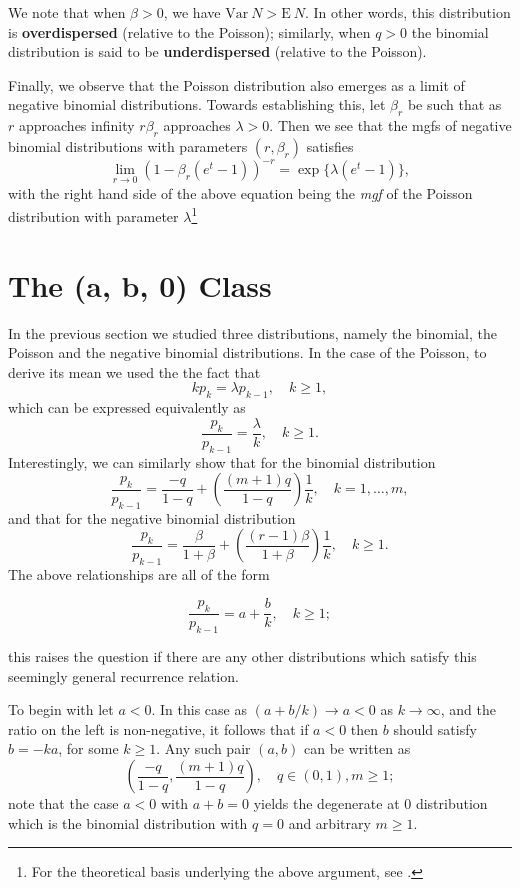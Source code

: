 \documentclass[]{book}
\let\rmarkdownfootnote\footnote%
\def\footnote{\protect\rmarkdownfootnote}
\theoremstyle{definition}
\theoremstyle{definition}
\theoremstyle{definition}
\theoremstyle{remark}
\begin{document}
We note that when \(\beta>0\), we have
\(\mathrm{Var}~{N} >\mathrm{E}~{N}\). In other words, this distribution
is \textbf{overdispersed} (relative to the Poisson); similarly, when
\(q>0\) the binomial distribution is said to be \textbf{underdispersed}
(relative to the Poisson).

Finally, we observe that the Poisson distribution also emerges as a
limit of negative binomial distributions. Towards establishing this, let
\(\beta_r\) be such that as \(r\) approaches infinity \(r\beta_r\)
approaches \(\lambda>0\). Then we see that the mgfs of negative binomial
distributions with parameters \((r,\beta_r)\) satisfies \[
\lim_{r\rightarrow 0} (1-\beta_r(e^t-1))^{-r}=\exp\{\lambda(e^t-1)\},
\] with the right hand side of the above equation being the \emph{mgf}
of the Poisson distribution with parameter \(\lambda\)\footnote{For the
  theoretical basis underlying the above argument, see
  \citep{billingsley}.}

\section{The (a, b, 0) Class}\label{S:the-a-b-0-class}

In the previous section we studied three distributions, namely the
binomial, the Poisson and the negative binomial distributions. In the
case of the Poisson, to derive its mean we used the the fact that \[
kp_k=\lambda p_{k-1}, \quad k\geq 1,
\] which can be expressed equivalently as \[
\frac{p_k}{p_{k-1}}=\frac{\lambda}{k}, \quad k\geq 1.
\] Interestingly, we can similarly show that for the binomial
distribution \[
\frac{p_k}{p_{k-1}}=\frac{-q}{1-q}+\left(\frac{(m+1)q}{1-q}\right)\frac{1}{k}, \quad k=1,\ldots,m,
\] and that for the negative binomial distribution \[
\frac{p_k}{p_{k-1}}=\frac{\beta}{1+\beta}+\left(\frac{(r-1)\beta}{1+\beta}\right)\frac{1}{k}, \quad k\geq 1.
\] The above relationships are all of the form

\begin{equation}
\frac{p_k}{p_{k-1}}=a+\frac{b}{k}, \quad k\geq 1;
\label{eq:ab0}
\end{equation}

this raises the question if there are any other distributions which
satisfy this seemingly general recurrence relation.

To begin with let \(a<0\). In this case as \((a+b/k)\rightarrow a<0\) as
\(k\rightarrow \infty\), and the ratio on the left is non-negative, it
follows that if \(a<0\) then \(b\) should satisfy \(b=-ka\), for some
\(k\geq 1\). Any such pair \((a,b)\) can be written as \[
\left(\frac{-q}{1-q},\frac{(m+1)q}{1-q}\right), \quad q\in(0,1), m\geq 1;
\] note that the case \(a<0\) with \(a+b=0\) yields the degenerate at
\(0\) distribution which is the binomial distribution with \(q=0\) and
arbitrary \(m\geq 1\).
\end{document}
